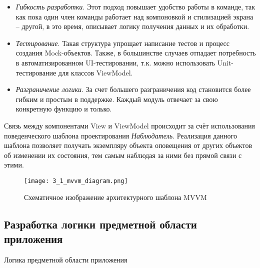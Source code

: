 \begin{itemize}
    \item \emph{Гибкость разработки}.
    Этот подход повышает удобство работы в команде, так как пока один член команды работает над компоновкой и стилизацией экрана -- другой, в это время, описывает логику получения данных и их обработки.
    \item \emph{Тестирование}.
    Такая структура упрощает написание тестов и процесс создания Mock-объектов.
    Также, в большинстве случаев отпадает потребность в автоматизированном UI-тестировании, т.к. можно использовать Unit-тестирование для классов ViewModel.
    \item \emph{Разграничение логики}.
    За счет большего разграничения код становится более гибким и простым в поддержке.
    Каждый модуль отвечает за свою конкретную функцию и только.
\end{itemize}

Связь между компонентами View и ViewModel происходит за счёт использования поведенческого шаблона проектирования \emph{Наблюдатель}.
Реализация данного шаблона позволяет получать экземпляру объекта оповещения от других объектов об изменении их состояния, тем самым наблюдая за ними без прямой связи с этими.

\begin{figure}[H]
    \centering
    \texttt{[image: 3\_1\_mvvm\_diagram.png]}
    \caption{Схематичное изображение архитектурного шаблона MVVM}
    \label{fig:design:architecture:mvvm}
\end{figure}

\subsection{Разработка логики предметной области приложения}
\label{sec:design:architecture:business}

Логика предметной области приложения